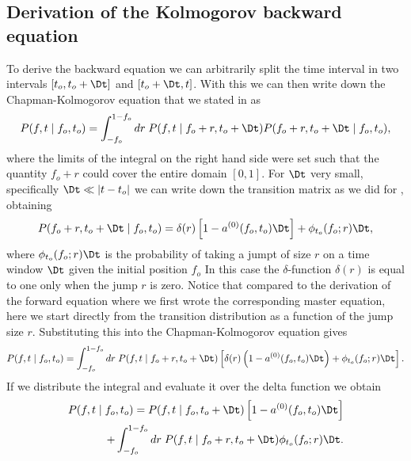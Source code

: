 \subsection{Derivation of the Kolmogorov backward equation}

To derive the backward equation we can arbitrarily split the time interval in
two intervals $[t_o, t_o + \Dt]$ and $[t_o + \Dt, t]$. With this we can then
write down the Chapman-Kolmogorov equation that we stated in
 as
\begin{equation}
  P(f, t \mid f_o, t_o) = \int_{-f_o}^{1 - f_o} dr \;
  P(f, t \mid f_o + r, t_o + \Dt)
  P(f_o + r, t_o + \Dt \mid f_o, t_o),
\end{equation}
where the limits of the integral on the right hand side were set such that the
quantity $f_o + r$ could cover the entire domain $[0, 1]$. For $\Dt$ very small,
specifically $\Dt \ll |t - t_o|$ we can write down the transition matrix as we
did for , obtaining
\begin{equation}
	P(f_o + r, t_o + \Dt \mid f_o, t_o) =
	\delta(r) \left[
	1 - a^{(0)}(f_o, t_o) \Dt
	\right] +
	\phi_{t_o}(f_o; r) \Dt,
\end{equation}
where $\phi_{t_o}(f_o; r) \Dt$ is the probability of taking a jumpt of size $r$
on a time window $\Dt$ given the initial position $f_o$ In this case the
$\delta$-function $\delta(r)$ is equal to one only when the jump $r$ is zero.
Notice that compared to the derivation of the forward equation where we first
wrote the corresponding master equation, here we start directly from the
transition distribution as a function of the jump size $r$. Substituting this
into the Chapman-Kolmogorov equation gives
\begin{equation}
	P(f, t \mid f_o, t_o) = \int_{-f_o}^{1 - f_o} dr\;
	P(f, t \mid f_o + r, t_o + \Dt)
	\left[
	\delta(r) \left( 1 - a^{(0)}(f_o, t_o) \Dt \right) +
	\phi_{t_o}(f_o; r) \Dt
	\right].
\end{equation}
If we distribute the integral and evaluate it over the delta function we obtain
\begin{equation}
	\begin{split}
		P(f, t \mid f_o, t_o) = P(f, t \mid f_o, t_o + \Dt)
		\left[
		1 - a^{(0)}(f_o, t_o)\Dt
		\right]\\ +
		\int_{-f_o}^{1 - f_o} dr\; P(f, t \mid f_o + r, t_o + \Dt)
		\phi_{t_o}(f_o; r) \Dt.
	\end{split}
	\label{eq_chap_kol_delta_eval_backwards}
\end{equation}
